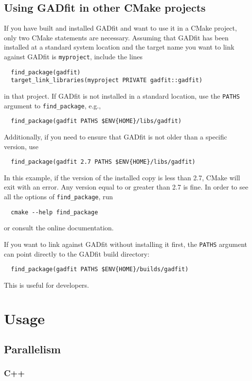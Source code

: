 \documentclass{article}
\begin{document}
\subsection{Using GADfit in other CMake projects}

If you have built and installed GADfit and want to use it in a CMake project, only two CMake statements are necessary. Assuming that GADfit has been installed at a standard system location and the target name you want to link against GADfit is \texttt{myproject}, include the lines
\begin{verbatim}
  find_package(gadfit)
  target_link_libraries(myproject PRIVATE gadfit::gadfit)
\end{verbatim}
in that project. If GADfit is not installed in a standard location, use the \texttt{PATHS} argument to \verb+find_package+, e.g.,
\begin{verbatim}
  find_package(gadfit PATHS $ENV{HOME}/libs/gadfit)
\end{verbatim}
Additionally, if you need to ensure that GADfit is not older than a specific version, use
\begin{verbatim}
  find_package(gadfit 2.7 PATHS $ENV{HOME}/libs/gadfit)
\end{verbatim}
In this example, if the version of the installed copy is less than 2.7, CMake will exit with an error. Any version equal to or greater than 2.7 is fine. In order to see all the options of \verb+find_package+, run
\begin{verbatim}
  cmake --help find_package
\end{verbatim}
or consult the online documentation.

If you want to link against GADfit without installing it first, the \texttt{PATHS} argument can point directly to the GADfit build directory:
\begin{verbatim}
  find_package(gadfit PATHS $ENV{HOME}/builds/gadfit)
\end{verbatim}
This is useful for developers.

\section{Usage}

\subsection{Parallelism}

\subsubsection{C++}
\end{document}
